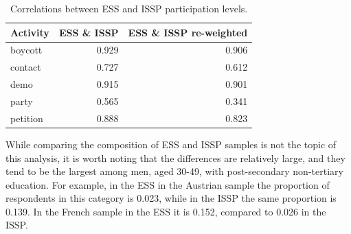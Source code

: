 \documentclass[12pt,]{article}
\begin{document}
\begin{table}[t]

\caption{\label{tab:sample-re-weighting}Correlations between ESS and ISSP participation levels.}
\centering
\fontsize{11}{13}\selectfont
\begin{tabular}{lrr}
\toprule
Activity & ESS \& ISSP & ESS \& ISSP re-weighted\\
\midrule
\rowcolor{gray!6}  boycott & 0.929 & 0.906\\
contact & 0.727 & 0.612\\
\rowcolor{gray!6}  demo & 0.915 & 0.901\\
party & 0.565 & 0.341\\
\rowcolor{gray!6}  petition & 0.888 & 0.823\\
\bottomrule
\end{tabular}
\end{table}

While comparing the composition of ESS and ISSP samples is not the topic of this analysis, it is worth noting that the differences are relatively large, and they tend to be the largest among men, aged 30-49, with post-secondary non-tertiary education. For example, in the ESS in the Austrian sample the proportion of respondents in this category is 0.023, while in the ISSP the same proportion is 0.139. In the French sample in the ESS it is 0.152, compared to 0.026 in the ISSP.
\end{document}
